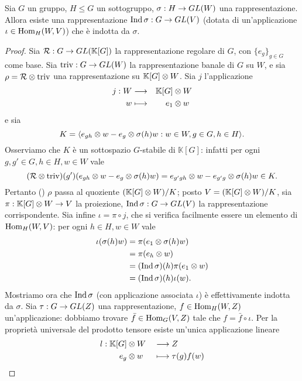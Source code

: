 \begin{proposition}
Sia $G$ un gruppo, $H\le G$ un sottogruppo, $\sigma:H\to GL(W)$ una rappresentazione. Allora esiste una rappresentazione $\operatorname{Ind}\sigma:G\to GL(V)$ (dotata di un'applicazione $\iota\in\operatorname{Hom}_H(W,V)$) che è indotta da $\sigma$.
\end{proposition}
\begin{proof}
Sia $\mathcal{R}:G\to GL(\mathbb{K}[G])$ la rappresentazione regolare di $G$, con $\{e_g\}_{g\in G}$ come base. Sia $\operatorname{triv}:G\to GL(W)$ la rappresentazione banale di $G$ su $W$, e sia $\rho=\mathcal{R}\otimes\operatorname{triv}$ una rappresentazione su $\mathbb{K}[G]\otimes W$. Sia $j$ l'applicazione
\begin{alignat*}{2}
j:W&\longrightarrow&\mathbb{K}[G]&\otimes W\\
w&\longmapsto&e_1&\otimes w
\end{alignat*}
e sia
$$
K=\langle e_{gh}\otimes w-e_g\otimes\sigma(h)w:w\in W,g\in G,h\in H\rangle.
$$
Osserviamo che $K$ è un sottospazio $G$-stabile di $\mathbb{K}[G]$: infatti per ogni $g,g'\in G\comma h\in H\comma w\in W$ vale
$$
(\mathcal{R}\otimes\operatorname{triv})(g')(e_{gh}\otimes w-e_g\otimes\sigma(h)w)=e_{g'gh}\otimes w-e_{g'g}\otimes\sigma(h)w\in K.
$$
Pertanto () $\rho$ passa al quoziente $(\mathbb{K}[G]\otimes W)/K$; posto $V=(\mathbb{K}[G]\otimes W)/K$, sia $\pi:\mathbb{K}[G]\otimes W\to V$ la proiezione, $\operatorname{Ind}\sigma:G\to GL(V)$ la rappresentazione corrispondente. Sia infine $\iota=\pi\circ j$, che si verifica facilmente essere un elemento di $\operatorname{Hom}_H(W,V)$: per ogni $h\in H\comma w\in W$ vale
\begin{align*}
\iota(\sigma(h)w)&=\pi(e_1\otimes\sigma(h)w)\\
&=\pi(e_h\otimes w)\\
&=(\operatorname{Ind}\sigma)(h)\pi(e_1\otimes w)\\
&=(\operatorname{Ind}\sigma)(h)\iota(w).
\end{align*}
Mostriamo ora che $\operatorname{Ind}\sigma$ (con applicazione associata $\iota$) è effettivamente indotta da $\sigma$. Sia $\tau:G\to GL(Z)$ una rappresentazione, $f\in\operatorname{Hom}_H(W,Z)$ un'applicazione: dobbiamo trovare $\bar{f}\in\operatorname{Hom}_G(V,Z)$ tale che $f=\bar{f}\circ\iota$. Per la proprietà universale del prodotto tensore esiste un'unica applicazione lineare
\begin{alignat*}{2}
l:\mathbb{K}[G]&\otimes W&&\longrightarrow Z\\
e_g&\otimes w&&\longmapsto\tau(g)f(w)
\end{alignat*}

\end{proof}
